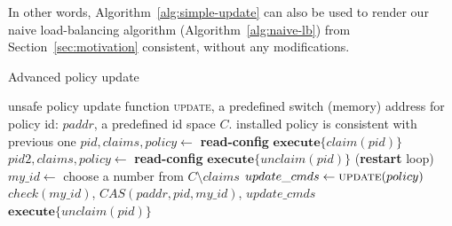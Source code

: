 \documentclass[conference]{sigcomm-alternate}
\newcommand{\hide}[1]{}
\newcommand{\claimcheck}{check\xspace}
\newcommand{\paddr}{\textit{paddr}\xspace}
\newcommand{\pid}{\textit{pid}\xspace}
\newcommand{\ufunc}{update} %
\newcommand{\ack}{\textit{ack}}
\begin{document}
In other words, Algorithm~\ref{alg:simple-update} can also be used
to render our naive load-balancing algorithm (Algorithm~\ref{alg:naive-lb}) from Section~\ref{sec:motivation}
consistent, without any modifications.


\hide{
We compute our new suggested policy by applying the update requests on
top of current policy, supporting any kind of requests and
policies. Then we make a transaction (using the bundle feature) to
atomically check that our policy id is not blocked by another controller, to change the current policy id to ours (an action that would fail if the current policy id is no longer what we are counting of) and to actually configure our new policy.

If one of the actions in the transaction fails we try again. There is no progress guaranty for each controller but there is one for the whole system - at least one of the controller will succeed in fulfilling its update requirements.
}

\begin{algorithm}[t]
    \caption{Advanced policy update}
    \label{alg:update}
    \begin{algorithmic}[1]
        \Require unsafe policy update function \textsc{\ufunc}, a predefined switch (memory) address for policy id: $\paddr$, a predefined id space $C$.
    \Ensure installed policy is consistent with previous one
 		\Repeat
		 	\State $\pid,claims,policy\gets$ \textbf{read-config} %
 			\State $\textbf{execute}\{claim(\pid)\}$
 			\State $\pid 2,claims,policy\gets$ \textbf{read-config} %
 			\If {$\pid\neq \pid 2$}
	 			\State $\textbf{execute} \{unclaim(\pid)\}$
 				 (\textbf{restart} loop)
 			\EndIf
 			\State $my\_id\gets$ choose a number from $C\setminus claims$
 			\State $update\_cmds\gets \textsc{\ufunc}(policy)$
 			\startTxn
 				\State $\claimcheck(my\_id)$,
	 			\State $CAS(\paddr, \pid,my\_id)$,
	 			\State $update\_cmds$ %
 			\endTxn
	 		\State $\textbf{execute} \{unclaim(\pid)\}$
     	\Until{$res=\ack$}
			\Return

    \end{algorithmic}
\end{algorithm}



%
%
%
\end{document}
